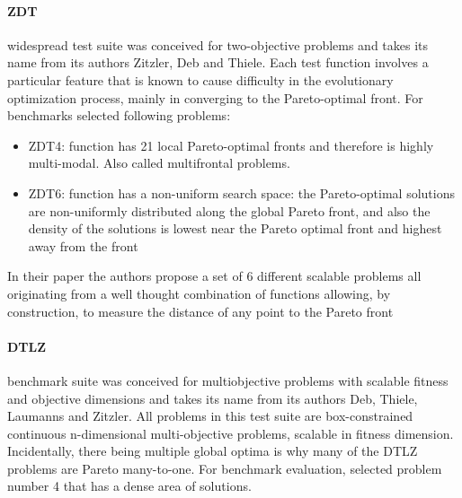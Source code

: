         \paragraph{ZDT} widespread test suite\cite{ZitzlerDT00} was conceived for two-objective problems and takes its name from its authors Zitzler, Deb and Thiele. Each test function involves a particular feature that is known to cause difficulty in the evolutionary optimization process, mainly in converging to the Pareto-optimal front.
        For benchmarks selected following problems:
        \begin{itemize}
            \item ZDT4: function has 21 local Pareto-optimal fronts and therefore is highly multi-modal. Also called multifrontal problems.
            \item ZDT6: function has a non-uniform search space: the Pareto-optimal solutions are non-uniformly distributed along the global Pareto front, and also the density of the solutions is lowest near the Pareto optimal front and highest away from the front
        \end{itemize}

        In their paper the authors propose a set of 6 different scalable problems all originating from a well thought combination of functions allowing, by construction, to measure the distance of any point to the Pareto front

        \paragraph{DTLZ} benchmark suite\cite{DebTLZ05} was conceived for multiobjective problems with scalable fitness and objective dimensions and takes its name from its authors Deb, Thiele, Laumanns and Zitzler. All problems in this test suite are box-constrained continuous n-dimensional multi-objective problems, scalable in fitness dimension. Incidentally, there being multiple global optima is why many of the DTLZ problems are Pareto many-to-one. For benchmark evaluation, selected problem number 4 that has a dense area of solutions.

